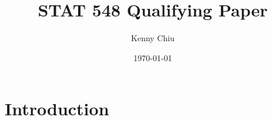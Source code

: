 \documentclass[10pt]{article}
\title{\todo\\\vspace{0.5em}\large{STAT 548 Qualifying Paper}}
\author{Kenny Chiu}
\date{\today}
\begin{document}
\maketitle

\vspace{2em}

\begin{abstract}
\todo
\end{abstract}

\vspace{2em}


\section{Introduction}


\newpage


\printbibliography


\newpage


\appendix

\section{}
\end{document}
